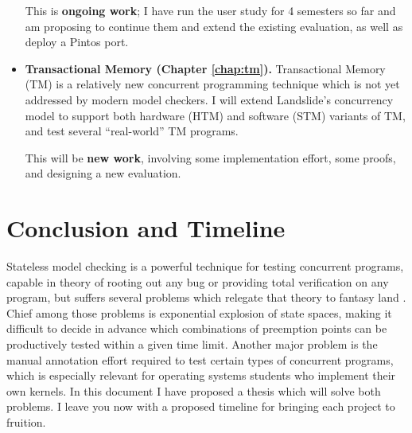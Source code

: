 \documentclass[12pt]{cmuthesis}
\begin{document}
\begin{itemize}
		This is {\bf ongoing work}; I have run the user study for 4 semesters so far and am proposing to continue them
		and extend the existing evaluation,
		as well as deploy a Pintos port.
	\item {\bf Transactional Memory (Chapter \ref{chap:tm}).}
		Transactional Memory (TM) is a relatively new concurrent programming technique \cite{transactional-memory}
		which is not yet addressed by modern model checkers.
		I will extend Landslide's concurrency model to support both hardware (HTM) and software (STM) variants of TM,
		and test several ``real-world'' TM programs.

		This will be {\bf new work},
		involving some implementation effort, some proofs, and designing a new evaluation.
\end{itemize}












\chapter{Conclusion and Timeline}

Stateless model checking is a powerful technique for testing concurrent programs,
capable in theory of rooting out any bug or providing total verification on any program,
but suffers several problems which relegate that theory to fantasy land \cite{vargomax}.
Chief among those problems is exponential explosion of state spaces,
making it difficult to decide in advance which combinations of preemption points can be productively tested within a given time limit.
Another major problem is the manual annotation effort required to test certain types of concurrent programs,
which is especially relevant for operating systems students who implement their own kernels.
In this document I have proposed a thesis which will solve both problems.
I leave you now with a proposed timeline for bringing each project to fruition.
\end{document}
